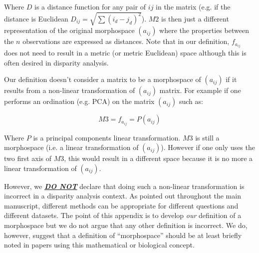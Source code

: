 \documentclass[12pt,letterpaper]{article}
\begin{document}
\noindent Where $D$ is a distance function for any pair of $ij$ in the matrix (e.g. if the distance is Euclidean $D_{ij} = \sqrt{\sum(i_{d}-j_{d})^2}$).
$M2$ is then just a different representation of the original morphospace $(a_{ij})$ where the properties between the $n$ observations are expressed as distances.
Note that in our definition, $f_{a_{ij}}$ does not need to result in a metric (or metric Euclidean) space although this is often desired in disparity analysis.

Our definition doesn't consider a matrix to be a morphospace of $(a_{ij})$ if it results from a non-linear transformation of $(a_{ij})$ matrix.
For example if one performs an ordination (e.g. PCA) on the matrix $(a_{ij})$ such as:

\begin{equation}
    M3 = f_{a_{ij}} = P(a_{ij})
\end{equation}

\noindent Where $P$ is a principal components linear transformation.
$M3$ is still a morphospace (i.e. a linear transformation of $(a_{ij})$). However if one only uses the two first axis of $M3$, this would result in a different space because it is no more a linear transformation of $(a_{ij})$.

However, we \textbf{\underline{\textit{DO NOT}}} declare that doing such a non-linear transformation is incorrect in a disparity analysis context.
As pointed out throughout the main manuscript, different methods can be appropriate for different questions and different datasets.
The point of this appendix is to develop \textit{our} definition of a morphospace but we do not argue that any other definition is incorrect.
We do, however, suggest that a definition of ``morphospace'' should be at least briefly noted in papers using this mathematical or biological concept.




\end{document}
